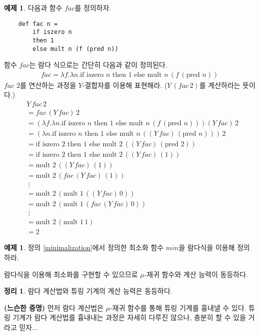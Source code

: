 \documentclass[b5paper, 11pt]{book}
\theoremstyle{definition}
\newtheorem{thm}[defn]{정리}
\newtheorem{ex}[defn]{예제}
\newenvironment{pf*}{\pushQED{\qed}\pf}
{\popQED\endpf}
\begin{document}
\begin{ex}
    다음과 함수 $fac$를 정의하자.
    \begin{lstlisting}
    def fac n =
        if iszero n 
        then 1 
        else mult n (f (pred n))
    \end{lstlisting}
    함수 $fac$는 람다 식으로는 간단히 다음과 같이 정의된다.
    \begin{align*}
        fac = \lambda f. \lambda n. \text{if } \text{iszero } n \text{ then }
        1 \text{ else } \text{mult } n \, (f \, (\text{pred } n))
    \end{align*}
    $fac$ 2를 연산하는 과정을 $Y$-결합자를 이용해 표현해라. ($Y \, (fac \, 2)$를 계산하라는 뜻이다.)
    \begin{align*}
        &Y \, fac \, 2 \\ 
        &= fac \, (Y \, fac) \, 2 \\ 
        &= (\lambda f. \lambda n. \text{if } \text{iszero } n \text{ then }
        1 \text{ else } \text{mult } n \, (f \, (\text{pred } n))) (Y \, fac) \, 2 \\
        &= (\lambda n. \text{if } \text{iszero } n \text{ then }
        1 \text{ else } \text{mult } n \, ((Y \, fac) \, (\text{pred } n))) \, 2 \\
        &=   \text{if } \text{iszero } 2 \text{ then }
        1 \text{ else } \text{mult } 2 \, ((Y \, fac) \, (\text{pred } 2))\\
        &=  \text{if } \text{iszero } 2 \text{ then }
        1 \text{ else } \text{mult } 2 \, ((Y \, fac) \, (1)) \\ 
        &= \text{mult } 2 \, ((Y \, fac) \, (1)) \\
        &= \text{mult } 2 \, (fac \, (Y \, fac) \, (1)) \\ 
        &\; \vdots \\ 
        &= \text{mult } 2 \, (\text{mult } 1 \, ((Y \, fac) \, 0)) \\
        &= \text{mult } 2 \, (\text{mult } 1 \, (fac \, (Y \, fac) \, 0)) \\ 
        &\; \vdots \\ 
        &= \text{mult } 2 \, (\text{mult } 1 \, 1) \\
        &= 2 
    \end{align*}
\end{ex}
\begin{ex}
    정의 \ref{minimalization}에서 정의한 최소화 함수 $min$을 람다식을 이용해 정의하라.
\end{ex}
람다식을 이용해 최소화를 구현할 수 있으므로 $\mu$-재귀 함수와 계산 능력이 동등하다. 
\begin{thm}
    람다 계산법와 튜링 기계의 계산 능력은 동등하다.
\end{thm}
\begin{pf*}
    \textbf{(느슨한 증명)}
    먼저 람다 계산법은 $\mu$-재귀 함수를 통해 튜링 기계를 흉내낼 수 있다. 튜링 기계가 람다 계산법를 흉내내는 과정은 자세히 다루진 않으나, 충분히 할 수 있을 거라고 믿자...
\end{pf*}
\end{document}
